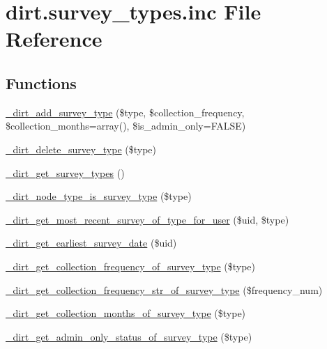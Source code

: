 \hypertarget{dirt_8survey__types_8inc}{}\section{dirt.\+survey\+\_\+types.\+inc File Reference}
\label{dirt_8survey__types_8inc}
\subsection*{Functions}
\begin{DoxyCompactItemize}
\item 
\mbox{\hyperlink{dirt_8survey__types_8inc_aed945245ecae97ebf2928aa638cc4828}{\+\_\+dirt\+\_\+add\+\_\+survey\+\_\+type}} (\$type, \$collection\+\_\+frequency, \$collection\+\_\+months=array(), \$is\+\_\+admin\+\_\+only=F\+A\+L\+SE)
\item 
\mbox{\hyperlink{dirt_8survey__types_8inc_a6d4ede5a8bdb2b158700756e4a1047f7}{\+\_\+dirt\+\_\+delete\+\_\+survey\+\_\+type}} (\$type)
\item 
\mbox{\hyperlink{dirt_8survey__types_8inc_a06d62ab3f3a014f5e671a65863ef0fc0}{\+\_\+dirt\+\_\+get\+\_\+survey\+\_\+types}} ()
\item 
\mbox{\hyperlink{dirt_8survey__types_8inc_aac3063bd86c2980e26a77c018c9b74d2}{\+\_\+dirt\+\_\+node\+\_\+type\+\_\+is\+\_\+survey\+\_\+type}} (\$type)
\item 
\mbox{\hyperlink{dirt_8survey__types_8inc_acd53a42111c9296d066116901bee3e0f}{\+\_\+dirt\+\_\+get\+\_\+most\+\_\+recent\+\_\+survey\+\_\+of\+\_\+type\+\_\+for\+\_\+user}} (\$uid, \$type)
\item 
\mbox{\hyperlink{dirt_8survey__types_8inc_a1a753b3547346d101c37efa99cc5d45c}{\+\_\+dirt\+\_\+get\+\_\+earliest\+\_\+survey\+\_\+date}} (\$uid)
\item 
\mbox{\hyperlink{dirt_8survey__types_8inc_ad4046b68c0497c09450d0f6501afdd7e}{\+\_\+dirt\+\_\+get\+\_\+collection\+\_\+frequency\+\_\+of\+\_\+survey\+\_\+type}} (\$type)
\item 
\mbox{\hyperlink{dirt_8survey__types_8inc_a4b269d84bb119501e44d68bd2a5a3b69}{\+\_\+dirt\+\_\+get\+\_\+collection\+\_\+frequency\+\_\+str\+\_\+of\+\_\+survey\+\_\+type}} (\$frequency\+\_\+num)
\item 
\mbox{\hyperlink{dirt_8survey__types_8inc_a9908be350a8871c2521d909c904de7e1}{\+\_\+dirt\+\_\+get\+\_\+collection\+\_\+months\+\_\+of\+\_\+survey\+\_\+type}} (\$type)
\item 
\mbox{\hyperlink{dirt_8survey__types_8inc_a07597d735c5cfacbeed7589343c5d5c6}{\+\_\+dirt\+\_\+get\+\_\+admin\+\_\+only\+\_\+status\+\_\+of\+\_\+survey\+\_\+type}} (\$type)

\end{DoxyCompactItemize}
